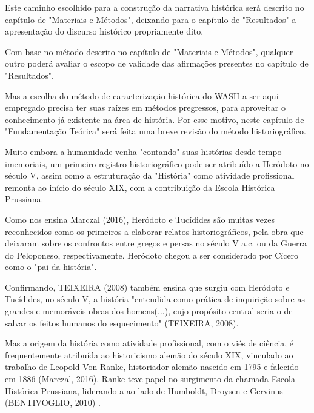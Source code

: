 Este caminho escolhido para a construção da narrativa histórica será descrito no capítulo de "Materiais e Métodos", deixando para o capítulo de "Resultados" a apresentação do discurso histórico propriamente dito.

Com base no método descrito no capítulo de "Materiais e Métodos", qualquer outro poderá avaliar o escopo de validade das afirmações presentes no capítulo de "Resultados".

Mas a escolha do método de caracterização histórica do WASH a ser aqui empregado precisa ter suas raízes em métodos pregressos, para aproveitar o conhecimento já existente na área de história. Por esse motivo, neste capítulo de "Fundamentação Teórica" será feita uma breve revisão do método historiográfico.

Muito embora a humanidade venha "contando" suas histórias desde tempo imemoriais, um primeiro registro historiográfico pode ser atribuído a Heródoto no século V, assim como a estruturação da "História" como atividade profissional remonta ao início do século XIX, com a contribuição da Escola Histórica Prussiana.

Como nos ensina  Marczal (2016),  Heródoto e Tucídides são muitas vezes reconhecidos como os primeiros a elaborar relatos historiográficos, pela obra que deixaram sobre os confrontos entre gregos e persas no século V a.c. ou da Guerra do Peloponeso, respectivamente. Heródoto chegou a ser considerado por Cícero como o "pai da história".

Confirmando, TEIXEIRA (2008)  também ensina que surgiu com Heródoto e Tucídides, no século V, a história "entendida como prática de inquirição sobre as grandes e memoráveis obras dos homens(...), cujo propósito central seria o de salvar os feitos humanos do esquecimento"  (TEIXEIRA, 2008).

Mas a origem da história como atividade profissional, com o viés de ciência, é frequentemente atribuída ao historicismo alemão do século XIX, vinculado ao trabalho de Leopold Von Ranke, historiador alemão nascido em 1795 e falecido em 1886 (Marczal, 2016). Ranke teve papel no surgimento da chamada Escola Histórica Prussiana, liderando-a ao lado de Humboldt, Droysen e Gervinus  (BENTIVOGLIO, 2010) .



